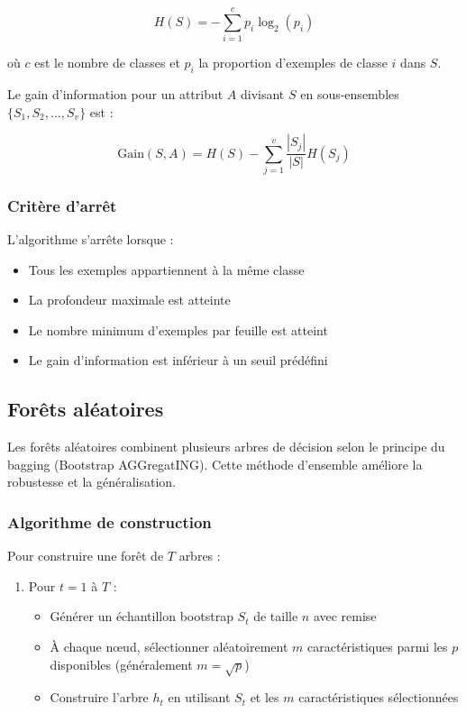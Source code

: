 \begin{equation}
    H(S) = -\sum_{i=1}^{c} p_i \log_2(p_i)
\end{equation}

où $c$ est le nombre de classes et $p_i$ la proportion d'exemples de classe $i$ dans $S$.

Le gain d'information pour un attribut $A$ divisant $S$ en sous-ensembles \\
$\{S_1, S_2, ..., S_v\}$ est :

\begin{equation}
    \text{Gain}(S,A) = H(S) - \sum_{j=1}^{v} \frac{|S_j|}{|S|} H(S_j)
\end{equation}

\subsubsection{Critère d'arrêt}
L'algorithme s'arrête lorsque :
\begin{itemize}
    \item Tous les exemples appartiennent à la même classe
    \item La profondeur maximale est atteinte
    \item Le nombre minimum d'exemples par feuille est atteint
    \item Le gain d'information est inférieur à un seuil prédéfini
\end{itemize}

\subsection{Forêts aléatoires}

Les forêts aléatoires combinent plusieurs arbres de décision selon le principe du bagging (Bootstrap AGGregatING). Cette méthode d'ensemble améliore la robustesse et la généralisation.

\subsubsection{Algorithme de construction}
Pour construire une forêt de $T$ arbres :

\begin{enumerate}
    \item Pour $t = 1$ à $T$ :
    \begin{itemize}
        \item Générer un échantillon bootstrap $S_t$ de taille $n$ avec remise
        \item À chaque nœud, sélectionner aléatoirement $m$ caractéristiques parmi les $p$ disponibles (généralement $m = \sqrt{p}$)
        \item Construire l'arbre $h_t$ en utilisant $S_t$ et les $m$ caractéristiques sélectionnées
    \end{itemize}
\end{enumerate}

